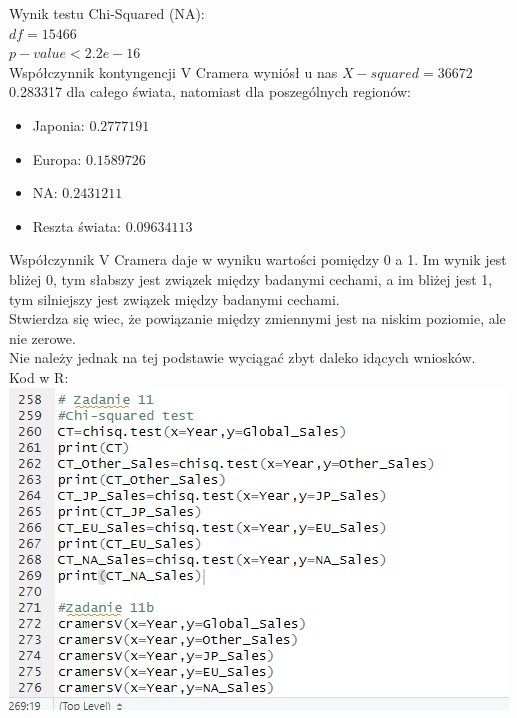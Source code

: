 \documentclass[12pt]{article}
\begin{document}
	Wynik testu Chi-Squared (NA):\\
	\(df=15466\)\\
	\(p-value < 2.2e-16\)\\
	Współczynnik kontyngencji V Cramera wyniósł u nas 
	\(X-squared = 36672\)\\0.283317 dla całego świata, natomiast dla poszególnych regionów:
	\begin{itemize}
		\item Japonia: $0.2777191$
		\item Europa: $0.1589726$
		\item NA: $0.2431211$
		\item Reszta świata: $0.09634113$
	\end{itemize}
Współczynnik V Cramera daje w wyniku wartości pomiędzy 0 a 1. Im wynik jest bliżej 0, tym słabszy jest związek między badanymi cechami, a im bliżej jest 1, tym silniejszy jest związek między badanymi cechami.\\
	Stwierdza się wiec, że powiązanie między zmiennymi jest na niskim poziomie, ale nie zerowe.\\
Nie należy jednak na tej podstawie wyciągać zbyt daleko idących wniosków.\\
	Kod w R:\\
	\includegraphics[scale=0.7]{Zad11}
	
\end{document}
